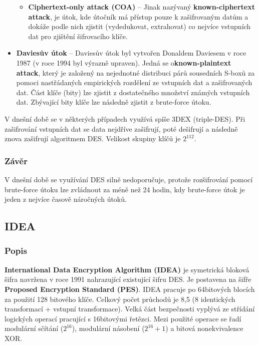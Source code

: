 \documentclass[12pt, a4paper]{article}
\begin{document}
\begin{itemize}
\begin{itemize}
				\item \textbf{Ciphertext-only attack (COA)} -- Jinak nazývaný \textbf{known-ciphertext attack}, je útok, kde útočník má přístup pouze k zašifrovaným datům a dokáže podle nich zjistit (vydedukovat, extrahovat) co nejvíce vstupních dat pro zjištění šifrovacího klíče.
			\end{itemize}
			\item \textbf{Daviesův útok} -- Daviesův útok byl vytvořen Donaldem Daviesem v roce 1987 (v roce 1994 byl výrazně upraven). Jedná se o\textbf{known-plaintext attack}, který je založený na nejednotné distribuci párů sousedních S-boxů za pomoci nastřádaných empirických rozdělení ze vstupních dat a zašifrovaných dat. Část klíče (bity) lze zjistit z dostatečného množství známých vstupních dat. Zbývající bity klíče lze následně zjistit z brute-force útoku. 
		\end{itemize}
	V dnešní době se v některých případech využívá spíše 3DEX (triple-DES). Při zašifrování vstupních dat se data nejdříve zašifrují, poté dešifrují a následně znova zašifrují algoritmem DES. Velikost skupiny klíčů je $2^{112}$.
		\subsubsection{Závěr}
		V dnešní době se využívání DES silně nedoporučuje, protože rozšifrování pomocí brute-force útoku lze zvládnout za méně než 24 hodin, kdy brute-force útok je jeden z nejvíce časově náročných útoků.
	\subsection{IDEA}
	\label{subsec:idea}
		\subsubsection{Popis}
		\textbf{International Data Encryption Algorithm (IDEA)} je symetrická bloková šifra navržena v roce 1991 nahrazující existující šifru DES. Je postavena na šifře \textbf{Proposed Encryption Standard (PES)}. IDEA pracuje po 64bitových blocích za použití 128 bitového klíče. Celkový počet průchodů je 8,5 (8 identických transformací + vstupní transformace). Velká část bezpečnosti vyplývá ze střídání logických operací pracující s 16bitovými řetězci. Mezi použité operace se řadí modulární sčítání ($2^{16}$), modulární násobení ($2^{16} + 1$) a bitová nonekvivalence XOR. 
\end{document}
